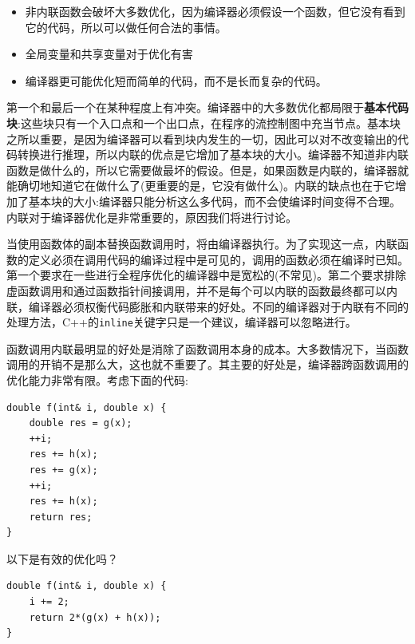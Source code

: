 \begin{itemize}
\item
非内联函数会破坏大多数优化，因为编译器必须假设一个函数，但它没有看到它的代码，所以可以做任何合法的事情。 

\item
全局变量和共享变量对于优化有害

\item
编译器更可能优化短而简单的代码，而不是长而复杂的代码。
	
\end{itemize}

第一个和最后一个在某种程度上有冲突。编译器中的大多数优化都局限于\textbf{基本代码块}:这些块只有一个入口点和一个出口点，在程序的流控制图中充当节点。基本块之所以重要，是因为编译器可以看到块内发生的一切，因此可以对不改变输出的代码转换进行推理，所以内联的优点是它增加了基本块的大小。编译器不知道非内联函数是做什么的，所以它需要做最坏的假设。但是，如果函数是内联的，编译器就能确切地知道它在做什么了(更重要的是，它没有做什么)。内联的缺点也在于它增加了基本块的大小:编译器只能分析这么多代码，而不会使编译时间变得不合理。内联对于编译器优化是非常重要的，原因我们将进行讨论。



当使用函数体的副本替换函数调用时，将由编译器执行。为了实现这一点，内联函数的定义必须在调用代码的编译过程中是可见的，调用的函数必须在编译时已知。第一个要求在一些进行全程序优化的编译器中是宽松的(不常见)。第二个要求排除虚函数调用和通过函数指针间接调用，并不是每个可以内联的函数最终都可以内联，编译器必须权衡代码膨胀和内联带来的好处。不同的编译器对于内联有不同的处理方法，C++的\texttt{inline}关键字只是一个建议，编译器可以忽略进行。

函数调用内联最明显的好处是消除了函数调用本身的成本。大多数情况下，当函数调用的开销不是那么大，这也就不重要了。其主要的好处是，编译器跨函数调用的优化能力非常有限。考虑下面的代码:

\begin{lstlisting}[style=styleCXX]
double f(int& i, double x) {
	double res = g(x);
	++i;
	res += h(x);
	res += g(x);
	++i;
	res += h(x);
	return res;
}
\end{lstlisting}

以下是有效的优化吗？

\begin{lstlisting}[style=styleCXX]
double f(int& i, double x) {
	i += 2;
	return 2*(g(x) + h(x));
}
\end{lstlisting}

